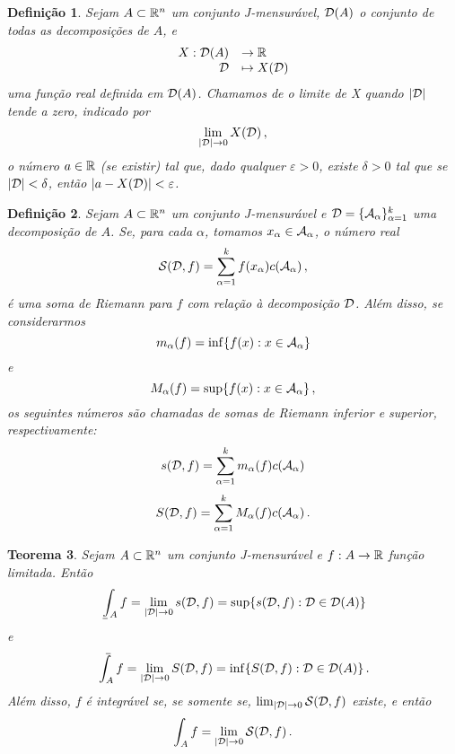 \documentclass[a4paper,12pt]{extreport}
\newtheorem{mydef}{Definição}
\newtheorem{myteo}[mydef]{Teorema}
\newif\ifspacesbetweentheos
\newcommand{\theonewpage}{
\ifspacesbetweentheos
  \newpage
\fi
}
\begin{document}
\begin{mydef}
  Sejam $A \subset \mathbb{R}^n$ um conjunto J-mensurável,
  $\mathcal{D}(A)$
  o conjunto de todas as decomposições de $A$,
  e
  $$
   \begin{array}{rl} X: \mathcal{D}(A) &\to \mathbb{R}\\ \mathcal{D} &\mapsto X(\mathcal{D}) \end{array} 
  $$
  uma função real definida em $\mathcal{D}(A)$.
  Chamamos de \emph{o limite de X quando $|\mathcal{D}|$ tende a zero},
  indicado por
  $$\lim_{|\mathcal{D}| \to 0} X(\mathcal{D})\,,$$
  o número $a \in \mathbb{R}$ (se existir) tal que,
  dado qualquer $\varepsilon > 0$,
  existe $\delta > 0$ tal que se $|\mathcal{D}| < \delta$,
  então $|a - X(\mathcal{D})| < \varepsilon$.
\end{mydef}



\begin{mydef}
  Sejam $A \subset \mathbb{R}^n$ um conjunto J-mensurável
  e $\mathcal{D} = \{\mathcal{A}_\alpha\}_{\alpha=1}^k$
  uma decomposição de $A$.
  Se, para cada $\alpha$,
  tomamos $x_\alpha \in \mathcal{A}_\alpha$,
  o número real
  \begin{equation}
    \mathcal{S}(\mathcal{D}, f)
    = \sum_{\alpha=1}^{k} f(x_\alpha) c(\mathcal{A}_\alpha)\,,
  \end{equation}
  é uma \emph{soma de Riemann}
  para $f$ com relação à decomposição $\mathcal{D}$.
  Além disso, se considerarmos
  \begin{equation}
    m_\alpha(f) = \inf \{f(x): x \in \mathcal{A}_\alpha \}
  \end{equation}
  e
  \begin{equation}
    M_\alpha(f) = \sup \{f(x): x \in \mathcal{A}_\alpha \}\,,
  \end{equation}
  os seguintes números são chamadas de
  \emph{somas de Riemann inferior e superior}, respectivamente:
  \begin{equation}
    s(\mathcal{D}, f) = \sum_{\alpha=1}^{k} m_\alpha(f) c(\mathcal{A}_\alpha)
  \end{equation}
  \begin{equation}
    S(\mathcal{D}, f) = \sum_{\alpha=1}^{k} M_\alpha(f) c(\mathcal{A}_\alpha)\,.
  \end{equation}

\end{mydef}


\theonewpage


\begin{myteo}
  Sejam $A \subset \mathbb{R}^n$ um conjunto J-mensurável e
  $f:A \to \mathbb{R}$ função limitada.
  Então
  \begin{equation}
    \lowint_A f
    = \lim_{|\Dcal| \to 0} s(\Dcal,f)
    = \sup \{s(\Dcal,f): \Dcal \in \Dcal(A)\}
  \end{equation}
  e
  \begin{equation}
    \upint_A f
    = \lim_{|\Dcal| \to 0} S(\Dcal,f)
    = \inf \{S(\Dcal,f): \Dcal \in \Dcal(A)\}\,.
  \end{equation}
  Além disso, $f$ é integrável se, se somente se,
  $\lim_{|\mathcal{D}| \to 0} \mathcal{S}(\mathcal{D},f)$ existe, e então
  \begin{equation}
    \int_A f = \lim_{|\mathcal{D}| \to 0} \mathcal{S}(\mathcal{D},f)\,.
  \end{equation}
\end{myteo}
\end{document}
